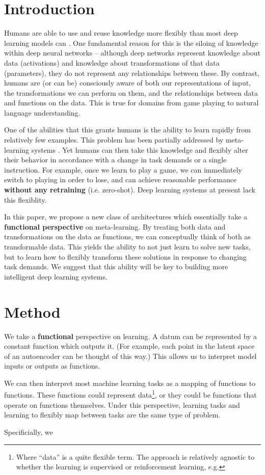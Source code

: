 \documentclass[11pt]{article}
\begin{document}
\section{Introduction}
Humans are able to use and reuse knowledge more flexibly than most deep learning models can \citep{Lake2017}. One fundamental reason for this is the siloing of knowledge within deep neural networks -- although deep networks represent knowledge about data (activations) and knowledge about transformations of that data (parameters), they do not represent any relationships between these. By contrast, humans are (or can be) consciously aware of both our representations of input, the transformations we can perform on them, and the relationships between data and functions on the data. This is true for domains from game playing to natural language understanding. \par
One of the abilities that this grants humans is the ability to learn rapidly from relatively few examples. This problem has been partially addressed by meta-learning systems \citep{}. Yet humans can then take this knowledge and flexibly alter their behavior in accordance with a change in task demands or a single instruction. For example, once we learn to play a game, we can immediately switch to playing in order to lose, and can achieve reasonable performance \textbf{without any retraining} (i.e. zero-shot). Deep learning systems at present lack this flexiblity. \par
In this paper, we propose a new class of architectures which essentially take a \textbf{functional perspective} on meta-learning. By treating both data and transformations on the data as functions, we can conceptually think of both as transformable data. This yields the ability to not just learn to solve new tasks, but to learn how to flexibly transform these solutions in response to changing task demands. We suggest that this ability will be key to building more intelligent deep learning systems. \par

\section{Method}
We take a \textbf{functional} perspective on learning. A datum can be represented by a constant function which outputs it. (For example, each point in the latent space of an autoencoder can be thought of this way.) This allows us to interpret model inputs or outputs as functions. \par
We can then interpret most machine learning tasks as a mapping of functions to functions. These functions could represent data\footnote{Where ``data'' is a quite flexible term. The approach is relatively agnostic to whether the learning is supervised or reinforcement learning, e.g.}, or they could be functions that operate on functions themselves. Under this perspective, learning tasks and learning to flexibly map between tasks are the same type of problem. \par
Specificially, we 
\end{document}
